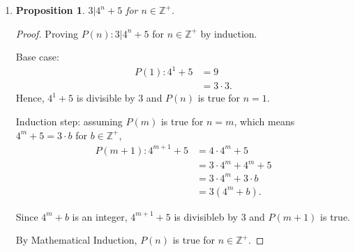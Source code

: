 \documentclass{article}
\newtheorem{prop}[thm]{Proposition}
\begin{document}
\begin{enumerate}[label={(\arabic*)}]
\begin{proof}
    Induction step: assuming $P(m)$ is true for $n = m$,
    \begin{align}
        P(m+1): \sum_{k=1}^{2^{m+1}}\frac{1}{k} & = \sum_{k=1}^{2^m}\frac{1}{k} + \sum_{k=2^m + 1}^{2^{m+1}}\frac{1}{k} \\
        & \ge 1 + \frac{m}{2} + (2^{m+1} - (2^m + 1) + 1)\frac{1}{2^{m+1}} \\ 
        & \ge 1 + \frac{m}{2} + (2^{m+1} - \frac{2^{m+1}}{2})\frac{1}{2^{m+1}} \\ 
        & \ge 1 + \frac{m}{2} + (\frac{1}{2} \cdot 2^{m+1})\frac{1}{2^{m+1}} \\ 
        & \ge 1 + \frac{m}{2} + \frac{1}{2} \\ 
        & \ge 1 + \frac{m+1}{2}.
    \end{align}

    Therefore, $P(m+1)$ is true.

    By Mathematical Induction, $P(n)$ is true for $n \in \mathbb{N}$.
\end{proof}

\item 
\begin{prop}
    $3 | 4^n + 5$ for $n \in \mathbb{Z}^+$.
\end{prop}
\begin{proof}
    Proving $P(n): 3|4^n + 5$ for $n \in \mathbb{Z}^+$ by induction.

    Base case: 
    \begin{align}
        P(1): 4^1 + 5 & = 9 \\
        & = 3 \cdot 3.
    \end{align}
    Hence, $4^1 + 5$ is divisible by 3 and $P(n)$ is true for $n = 1$.

    Induction step: assuming $P(m)$ is true for $n = m$, which means $4^m + 5 = 3 \cdot b$ for $b \in \mathbb{Z}^+$,
    \begin{align}
        P(m+1): 4^{m+1} + 5 & = 4 \cdot 4^m + 5 \\
        & = 3 \cdot 4^m + 4^m + 5 \\
        & = 3 \cdot 4^m + 3 \cdot b \\
        & = 3(4^m + b).
    \end{align}

    Since $4^m + b$ is an integer, $4^{m+1} + 5$ is divisibleb by 3 and $P(m+1)$ is true.

    By Mathematical Induction, $P(n)$ is true for $n \in \mathbb{Z}^+$.
\end{proof}


\end{enumerate}
\end{document}
